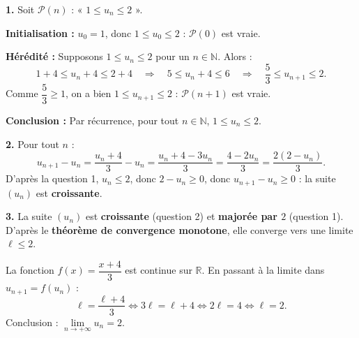 \documentclass[11pt]{article}
\begin{document}
\begin{corrige}
\textbf{1.} Soit $\mathcal{P}(n)$ : « $1 \leq u_n \leq 2$ ».

\textbf{Initialisation :} $u_0 = 1$, donc $1 \leq u_0 \leq 2$ : $\mathcal{P}(0)$ est vraie.

\textbf{Hérédité :} Supposons $1 \leq u_n \leq 2$ pour un $n \in \mathbb{N}$. Alors :
\[ 1 + 4 \leq u_n + 4 \leq 2 + 4 \quad\Longrightarrow\quad 5 \leq u_n + 4 \leq 6 \quad\Longrightarrow\quad \frac{5}{3} \leq u_{n+1} \leq 2. \]
Comme $\dfrac{5}{3} \geq 1$, on a bien $1 \leq u_{n+1} \leq 2$ : $\mathcal{P}(n+1)$ est vraie.

\textbf{Conclusion :} Par récurrence, pour tout $n \in \mathbb{N}$, $1 \leq u_n \leq 2$.

\textbf{2.} Pour tout $n$ :
\[ u_{n+1} - u_n = \frac{u_n + 4}{3} - u_n = \frac{u_n + 4 - 3u_n}{3} = \frac{4 - 2u_n}{3} = \frac{2(2 - u_n)}{3}. \]
D'après la question 1, $u_n \leq 2$, donc $2 - u_n \geq 0$, donc $u_{n+1} - u_n \geq 0$ : la suite $(u_n)$ est \textbf{croissante}.

\textbf{3.} La suite $(u_n)$ est \textbf{croissante} (question 2) et \textbf{majorée par $2$} (question 1). D'après le \textbf{théorème de convergence monotone}, elle converge vers une limite $\ell \leq 2$.

La fonction $f(x) = \dfrac{x+4}{3}$ est continue sur $\mathbb{R}$. En passant à la limite dans $u_{n+1} = f(u_n)$ :
\[ \ell = \frac{\ell + 4}{3} \iff 3\ell = \ell + 4 \iff 2\ell = 4 \iff \ell = 2. \]
Conclusion : $\lim\limits_{n \to +\infty} u_n = 2$.
\end{corrige}
\end{document}
